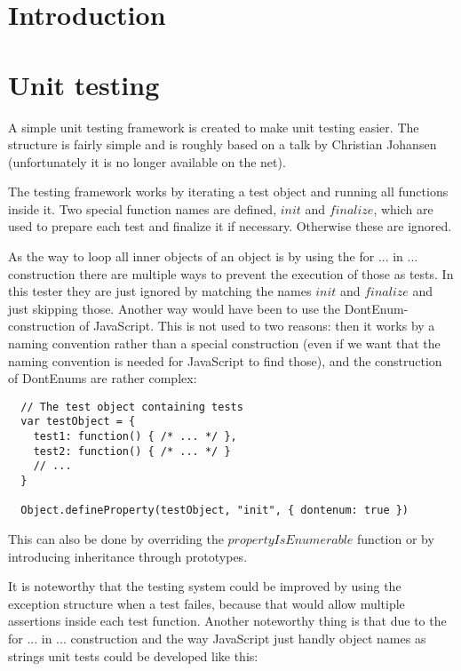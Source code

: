 \documentclass[a4paper,10pt]{article}
\author{
Søren Krogh -  20105661 \\
Emil Madsen - 20105376  \\
K. Rohde Fischer - 20052356\\}
\title{}
\begin{document}
\maketitle

\section*{Introduction}

\section*{Unit testing}
A simple unit testing framework is created to make unit testing
easier.  The structure is fairly simple and is roughly based on a talk
by Christian Johansen (unfortunately it is no longer available on the
net).

The testing framework works by iterating a test object and running all
functions inside it.  Two special function names are defined, $init$
and $finalize$, which are used to prepare each test and finalize it if
necessary.  Otherwise these are ignored.

As the way to loop all inner objects of an object is by using the for
... in ... construction there are multiple ways to prevent the
execution of those as tests.  In this tester they are just ignored by
matching the names $init$ and $finalize$ and just skipping those.
Another way would have been to use the DontEnum-construction of
JavaScript.  This is not used to two reasons: then it works by a
naming convention rather than a special construction (even if we want
that the naming convention is needed for JavaScript to find those),
and the construction of DontEnums are rather complex:

\begin{verbatim}
  // The test object containing tests
  var testObject = {
    test1: function() { /* ... */ },
    test2: function() { /* ... */ }
    // ...
  }

  Object.defineProperty(testObject, "init", { dontenum: true })
\end{verbatim}

This can also be done by overriding the $propertyIsEnumerable$
function or by introducing inheritance through prototypes.

It is noteworthy that the testing system could be improved by using
the exception structure when a test failes, because that would allow
multiple assertions inside each test function.  Another noteworthy
thing is that due to the for ... in ... construction and the way
JavaScript just handly object names as strings unit tests could be
developed like this:
\end{document}
